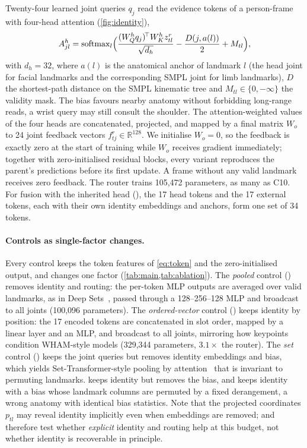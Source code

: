 Twenty-four learned joint queries $q_j$ read the evidence tokens of a person-frame with four-head attention (\cref{fig:identity}),
\begin{equation}
  A^h_{jl} = \operatorname{softmax}_l\!\Big(\frac{(W^h_Q q_j)^{\!\top} W^h_K z^r_{tl}}{\sqrt{d_h}} - \frac{D(j,a(l))}{2} + M_{tl}\Big),
  \label{eq:route}
\end{equation}
with $d_h=32$, where $a(l)$ is the anatomical anchor of landmark $l$ (the head joint for facial landmarks and the corresponding SMPL joint for limb landmarks), $D$ the shortest-path distance on the SMPL kinematic tree and $M_{tl}\in\{0,-\infty\}$ the validity mask.
The bias favours nearby anatomy without forbidding long-range reads, \eg a wrist query may still consult the shoulder.
The attention-weighted values of the four heads are concatenated, projected, and mapped by a final matrix $W_o$ to 24 joint feedback vectors $f^r_{tj}\in\mathbb{R}^{128}$.
We initialise $W_o=0$, so the feedback is exactly zero at the start of training while $W_o$ receives gradient immediately; together with zero-initialised residual blocks, every variant reproduces the parent's predictions before its first update.
A frame without any valid landmark receives zero feedback.
The router trains 105,472 parameters, as many as C10.
For fusion with the inherited head (), the 17 head tokens and the 17 external tokens, each with their own identity embeddings and anchors, form one set of 34 tokens.

\paragraph{Controls as single-factor changes.}
Every control keeps the token features of \cref{eq:token} and the zero-initialised output, and changes one factor (\cref{tab:main,tab:ablation}).
The \emph{pooled} control () removes identity and routing: the per-token MLP outputs are averaged over valid landmarks, as in Deep Sets~\cite{zaheer2017deepsets}, passed through a 128--256--128 MLP and broadcast to all joints (100,096 parameters).
The \emph{ordered-vector} control () keeps identity by position: the 17 encoded tokens are concatenated in slot order, mapped by a linear layer and an MLP, and broadcast to all joints, mirroring how keypoints condition WHAM-style models (329,344 parameters, $3.1\times$ the router).
The \emph{set} control () keeps the joint queries but removes identity embeddings and bias, which yields Set-Transformer-style pooling by attention~\cite{lee2019settransformer} that is invariant to permuting landmarks.
 keeps identity but removes the bias, and  keeps identity with a bias whose landmark columns are permuted by a fixed derangement, \ie a wrong anatomy with identical bias statistics.
Note that the projected coordinates $p_{tl}$ may reveal identity implicitly even when embeddings are removed;  and  therefore test whether \emph{explicit} identity and routing help at this budget, not whether identity is recoverable in principle.

